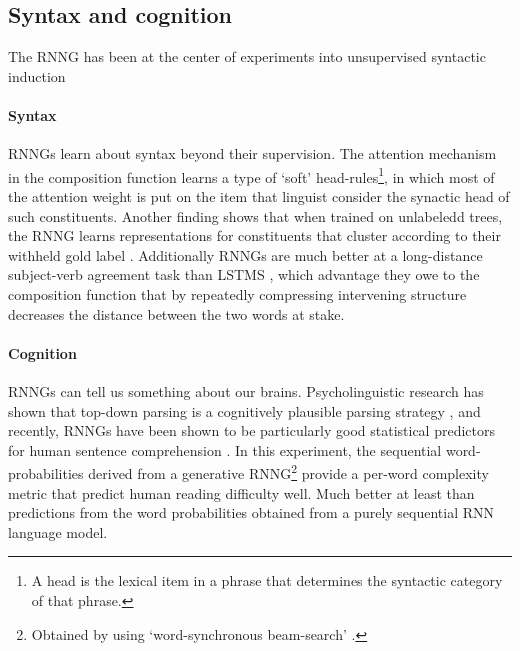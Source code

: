 \subsection{Syntax and cognition}
The RNNG has been at the center of experiments into unsupervised syntactic induction

\paragraph{Syntax} RNNGs learn about syntax beyond their supervision. The attention mechanism in the composition function learns a type of `soft' head-rules\footnote{A head is the lexical item in a phrase that determines the syntactic category of that phrase.}, in which most of the attention weight is put on the item that linguist consider the synactic head of such constituents. Another finding shows that when trained on unlabeledd trees, the RNNG learns representations for constituents that cluster according to their withheld gold label \citep{kuncoro2017syntax}. Additionally RNNGs are much better at a long-distance subject-verb agreement task than LSTMS \citep{linzen2016syntax,kuncoro2018learn}, which advantage they owe to the composition function that by repeatedly compressing intervening structure decreases the distance between the two words at stake.

\paragraph{Cognition} RNNGs can tell us something about our brains. Psycholinguistic research has shown that top-down parsing is a cognitively plausible parsing strategy \citep{brennan2016abstract}, and recently, RNNGs have been shown to be particularly good statistical predictors for human sentence comprehension \citep{hale2018beam}. In this experiment, the sequential word-probabilities derived from a generative RNNG\footnote{Obtained by using `word-synchronous beam-search' \citep{stern2017beam}.} provide a per-word complexity metric that predict human reading difficulty well. Much better at least than predictions from the word probabilities obtained from a purely sequential RNN language model.
